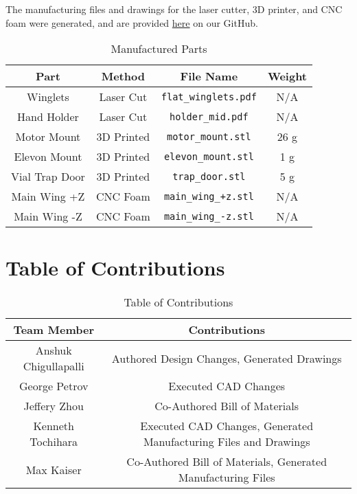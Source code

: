     The manufacturing files and drawings for the laser cutter, 3D printer, and CNC foam were generated, and are provided \href{https://github.com/ktt3/ae484/tree/main/homeworks/homework6/manufacturing}{here} on our GitHub.

    \begin{table}[]
        \centering
        \caption{Manufactured Parts}
        \begin{tabular}{|c|c|c|c|}
            \hline
            \textbf{Part} & \textbf{Method} & \textbf{File Name} & \textbf{Weight} \\ \hline
            Winglets & Laser Cut & \verb|flat_winglets.pdf| & N/A \\ \hline
            Hand Holder & Laser Cut & \verb|holder_mid.pdf| & N/A \\ \hline
            Motor Mount & 3D Printed & \verb|motor_mount.stl| & 26 g \\ \hline
            Elevon Mount & 3D Printed & \verb|elevon_mount.stl| & 1 g \\ \hline
            Vial Trap Door & 3D Printed & \verb|trap_door.stl| & 5 g \\ \hline
            Main Wing +Z & CNC Foam & \verb|main_wing_+z.stl| & N/A \\ \hline
            Main Wing -Z & CNC Foam & \verb|main_wing_-z.stl| & N/A \\ \hline
        \end{tabular}
    \end{table}

\section{Table of Contributions}

    \begin{table}[H]
        \centering
        \caption{Table of Contributions}
        \label{tab:contributions}
        \begin{tabular}{|c|c|}
            \hline
            \textbf{Team Member} & \textbf{Contributions}  \\ \hline
            Anshuk Chigullapalli & Authored Design Changes, Generated Drawings \\ \hline
            George Petrov & Executed CAD Changes \\ \hline
            Jeffery Zhou & Co-Authored Bill of Materials \\ \hline
            Kenneth Tochihara & Executed CAD Changes, Generated Manufacturing Files and Drawings \\ \hline
            Max Kaiser & Co-Authored Bill of Materials, Generated Manufacturing Files \\ \hline
        \end{tabular}
    \end{table}
    

